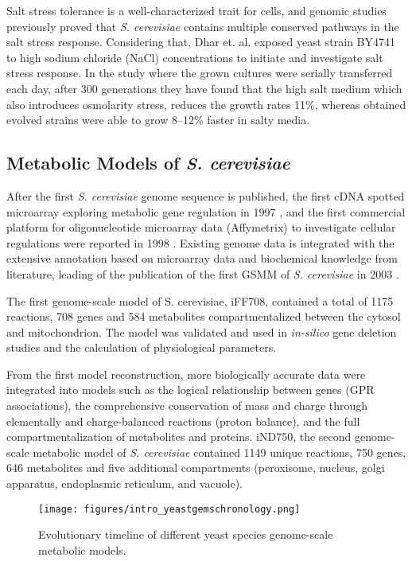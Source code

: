 Salt stress tolerance is a well-characterized trait for cells, and genomic studies previously proved that \emph{S. cerevisiae} contains multiple conserved pathways in the salt stress response\cite{gaxiola1992novel}. Considering that, Dhar et. al. exposed yeast strain BY4741 to high sodium chloride (NaCl) concentrations to initiate and investigate salt stress response. In the study where the grown cultures were serially transferred each day, after 300 generations they have found that the high salt medium which also introduces osmolarity stress, reduces the growth rates 11\%, whereas obtained evolved strains were able to grow 8–12\% faster in salty media.

\subsection{Metabolic Models of \emph{S. cerevisiae}}
After the first \emph{S. cerevisiae} genome sequence is published, the first cDNA spotted microarray exploring metabolic gene regulation in 1997 \cite{derisi1997exploring}, and the first commercial platform for oligonucleotide microarray data (Affymetrix) to investigate cellular regulations were reported in 1998 \cite{cho1998parallel}. Existing genome data is integrated with the extensive annotation based on microarray data and biochemical knowledge from literature, leading of the publication of the first GSMM of \emph{S. cerevisiae} in 2003 \cite{forster2003genome}.

The first genome-scale model of S. cerevisiae, iFF708, contained a total of 1175 reactions, 708 genes and 584 metabolites compartmentalized between the cytosol and mitochondrion. The model was validated and used in \emph{in-silico} gene deletion studies\cite{forster2003large} and the calculation of physiological parameters\cite{famili2003saccharomyces}.

From the first model reconstruction, more biologically accurate data were integrated into models such as the logical relationship between genes (GPR associations), the comprehensive conservation of mass and charge through elementally and charge-balanced reactions (proton balance), and the full compartmentalization of metabolites and proteins. iND750, the second genome-scale metabolic model of \emph{S. cerevisiae} contained 1149 unique reactions, 750	genes, 646 metabolites and five additional compartments (peroxisome, nucleus, golgi apparatus, endoplasmic reticulum, and vacuole)\cite{duarte2004reconstruction}.

\begin{figure}[H]
\texttt{[image: figures/intro\_yeastgemschronology.png]}
\caption[Evolutionary timeline of different yeast species genome-scale metabolic models]{Evolutionary timeline of different yeast species genome-scale metabolic models.}
\label{fig:intro_yeastgemschronology}
\end{figure}

